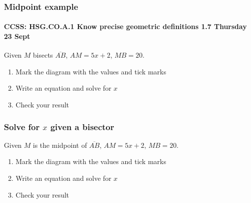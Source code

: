 \documentclass{beamer}
\begin{document}
\frame
{
  \frametitle{Midpoint example}
  \framesubtitle{CCSS: HSG.CO.A.1 Know precise geometric definitions  \hfill \alert{1.7 Thursday 23 Sept}}

  \begin{block}{Given $M$ bisects $\overline{AB}$, $AM=5x+2$, $MB=20$.}
    \begin{enumerate}
      \item Mark the diagram with the values and tick marks
      \item Write an equation and solve for $x$
      \item Check your result
    \end{enumerate} \vspace{1cm}
      \begin{center}
      \end{center}
  \end{block}
}

\frame
{
  \frametitle{Solve for $x$ given a bisector}
  Given $M$ is the midpoint of $\overline{AB}$, $AM=5x+2$, $MB=20$.
  \begin{enumerate}
    \item Mark the diagram with the values and tick marks
    \item Write an equation and solve for $x$
    \item Check your result
  \end{enumerate} \vspace{1cm}
    \begin{center}
    \end{center} \vspace{4cm}
}
\end{document}
